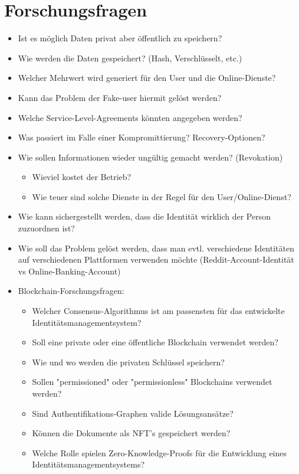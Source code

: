 \chapter{Forschungsfragen}
\label{cha:grundlagen}

\begin{itemize}
	\item Ist es möglich Daten privat aber öffentlich zu speichern?
	\item Wie werden die Daten gespeichert? (Hash, Verschlüsselt, etc.) 
	\item Welcher Mehrwert wird generiert für den User und die Online-Dienste?
	\item Kann das Problem der Fake-user hiermit gelöst werden?
	\item Welche Service-Level-Agreements könnten angegeben werden?
	\item Was passiert im Falle einer Kompromittierung?  Recovery-Optionen?
	\item Wie sollen Informationen wieder ungültig gemacht werden? (Revokation)
	\begin{itemize}
		\item Wieviel kostet der Betrieb?
		\item Wie teuer sind solche Dienste in der Regel für den User/Online-Dienst?
		
	\end{itemize}
	\item Wie kann sichergestellt werden, dass die Identität wirklich der Person zuzuordnen ist?
	\item Wie soll das Problem gelöst werden, dass man evtl. verschiedene Identitäten auf verschiedenen Plattformen verwenden möchte (Reddit-Account-Identität vs Online-Banking-Account)
	\item Blockchain-Forschungsfragen:
		\begin{itemize}
		\item Welcher Consensus-Algorithmus ist am passensten für das entwickelte Identitätsmanagementsystem?
		\item Soll eine private oder eine öffentliche Blockchain verwendet werden?
		\item Wie und wo werden die privaten Schlüssel speichern?
		\item Sollen "permissioned" oder "permissionless" Blockchains verwendet werden?
		\item Sind Authentifikations-Graphen valide Lösungsansätze?
		\item Können die Dokumente als NFT's gespeichert werden?
		\item Welche Rolle spielen Zero-Knowledge-Proofs für die Entwicklung eines Identitätsmanagementsystems?
		\end{itemize}
	
	
	
\end{itemize}